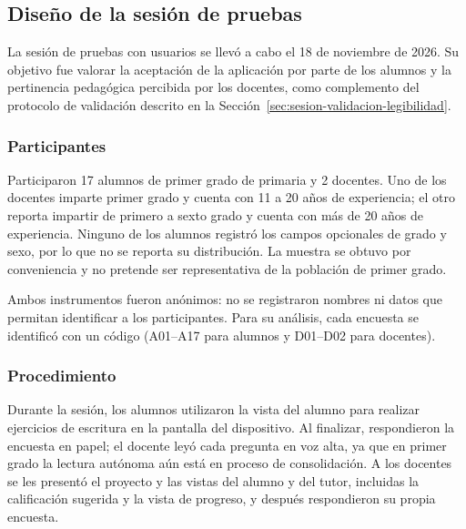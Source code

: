 \subsection{Diseño de la sesión de pruebas}
\label{sec:diseno-pruebas}

La sesión de pruebas con usuarios se llevó a cabo el 18 de noviembre de 2026. %
Su objetivo fue valorar la aceptación de la aplicación por parte de los alumnos y la pertinencia pedagógica percibida por los docentes, como complemento del protocolo de validación descrito en la Sección~\ref{sec:sesion-validacion-legibilidad}.

\subsubsection{Participantes}
Participaron 17 alumnos de primer grado de primaria y 2 docentes. Uno de los docentes imparte primer grado y cuenta con 11 a 20 años de experiencia; el otro reporta impartir de primero a sexto grado y cuenta con más de 20 años de experiencia. Ninguno de los alumnos registró los campos opcionales de grado y sexo, por lo que no se reporta su distribución. La muestra se obtuvo por conveniencia y no pretende ser representativa de la población de primer grado.

Ambos instrumentos fueron anónimos: no se registraron nombres ni datos que permitan identificar a los participantes. Para su análisis, cada encuesta se identificó con un código (A01--A17 para alumnos y D01--D02 para docentes).

\subsubsection{Procedimiento}
Durante la sesión, los alumnos utilizaron la vista del alumno para realizar ejercicios de escritura en la pantalla del dispositivo. %
Al finalizar, respondieron la encuesta en papel; el docente leyó cada pregunta en voz alta, ya que en primer grado la lectura autónoma aún está en proceso de consolidación. A los docentes se les presentó el proyecto y las vistas del alumno y del tutor, incluidas la calificación sugerida y la vista de progreso, y después respondieron su propia encuesta.

